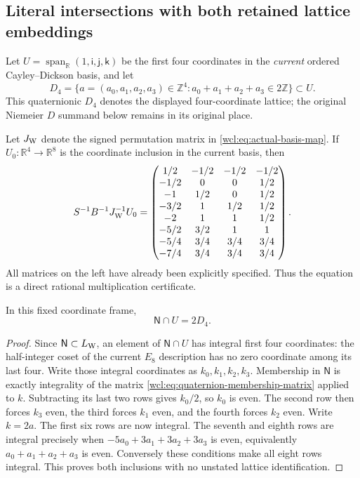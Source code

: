 \subsection{Literal intersections with both retained lattice embeddings}
\label{wcl:sec:literal-intersections}

Let $U=\operatorname{span}_{\mathbb R}(1,\mathsf i,\mathsf j,\mathsf k)$
be the first four coordinates in the \emph{current} ordered
Cayley--Dickson basis, and let
\[
 D_4=\{a=(a_0,a_1,a_2,a_3)\in\mathbb Z^4:
                          a_0+a_1+a_2+a_3\in2\mathbb Z\}\subset U.
\]
This quaternionic $D_4$ denotes the displayed four-coordinate lattice;
the original Niemeier $D$ summand below remains in its original place.

Let $J_{\rm W}$ denote the signed permutation matrix in
\eqref{wcl:eq:actual-basis-map}. If $U_0:\mathbb R^4\to\mathbb R^8$
is the coordinate inclusion in the current basis, then
\begin{equation}
 S^{-1}B^{-1}J_{\rm W}^{-1}U_0=
 \begin{pmatrix}
 1/2&-1/2&-1/2&-1/2\\
 -1/2&0&0&1/2\\
 -1&1/2&0&1/2\\
 -3/2&1&1/2&1/2\\
 -2&1&1&1/2\\
 -5/2&3/2&1&1\\
 -5/4&3/4&3/4&3/4\\
 -7/4&3/4&3/4&3/4
 \end{pmatrix}.
 \label{wcl:eq:quaternion-membership-matrix}
\end{equation}
All matrices on the left have already been explicitly specified.
Thus the equation is a direct rational multiplication certificate.

\begin{lemma}\label{wcl:lem:quaternion-intersection}
In this fixed coordinate frame,
\[
 \mathsf N\cap U=2D_4 .
\]
\end{lemma}
\begin{proof}
Since $\mathsf N\subset L_{\rm W}$, an element of $\mathsf N\cap U$
has integral first four coordinates: the half-integer coset of the
current $E_8$ description has no zero coordinate among its last four.
Write those integral coordinates as $k_0,k_1,k_2,k_3$. Membership in
$\mathsf N$ is exactly integrality of the matrix
\eqref{wcl:eq:quaternion-membership-matrix} applied to $k$.
Subtracting its last two rows gives $k_0/2$, so $k_0$ is even.
The second row then forces $k_3$ even, the third forces $k_1$ even,
and the fourth forces $k_2$ even. Write $k=2a$.
The first six rows are now integral. The seventh and eighth rows
are integral precisely when
$-5a_0+3a_1+3a_2+3a_3$ is even, equivalently
$a_0+a_1+a_2+a_3$ is even. Conversely these conditions make all eight
rows integral. This proves both inclusions with no unstated lattice
identification.
\end{proof}

